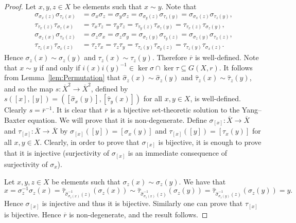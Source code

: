 	\begin{proof}
		Let $x,y,z\in X$ be elements such that $x\sim y$. Note that
		\begin{align*}
			\sigma_{\sigma_x(z)}\sigma_{\tau_z(x)} &
			=\sigma_x\sigma_z=\sigma_y\sigma_z=\sigma_{\sigma_y(z)}\sigma_{\tau_z(y)}
			=\sigma_{\sigma_x(z)}\sigma_{\tau_z(y)},\\
			\tau_{\tau_x(z)}\tau_{\sigma_z(x)} &=\tau_x\tau_z=\tau_y\tau_z
			=\tau_{\tau_y(z)}\tau_{\sigma_z(y)}=\tau_{\tau_x(z)}\tau_{\sigma_z(y)},\\
			\sigma_{\sigma_z(x)}\sigma_{\tau_x(z)} &=\sigma_z\sigma_x
			=\sigma_z\sigma_y=\sigma_{\sigma_z(y)}\sigma_{\tau_y(z)}
			=\sigma_{\sigma_z(y)}\sigma_{\tau_x(z)},\\
			\tau_{\tau_z(x)}\tau_{\sigma_x(z)} &=\tau_z\tau_x=\tau_z\tau_y
			=\tau_{\tau_z(y)}\tau_{\sigma_y(z)}=\tau_{\tau_z(y)}\tau_{\sigma_x(z)}.
		\end{align*}
		Hence $\sigma_z(x)\sim\sigma_z(y)$ and $\tau_z(x)\sim\tau_z(y)$. Therefore $\overline{r}$ is well-defined.
		Note that $x\sim y$ if and only if $i(x)i(y)^{-1}\in\ker\sigma\cap\ker\tau\subseteq G(X,r)$. It follows from Lemma~\ref{lem:Permutation}
		that $\widehat{\sigma}_z(x)\sim\widehat{\sigma}_z(y)$ and $\widehat{\tau}_z(x)\sim\widehat{\tau}_z(y)$, and so the map
		$s:\overline{X}^2\to\overline{X}^2$, defined by $s([x],[y])=([\widehat{\sigma}_x(y)],[\widehat{\tau}_y(x)])$ for all $x,y\in X$,	is well-defined. Clearly $s=\overline{r}^{-1}$. It is clear that $\overline{r}$ is a bijective set-theoretic
	 	solution to the Yang--Baxter equation. We will prove that it is non-degenerate. Define
		$\sigma_{[x]}\colon\overline{X}\to\overline{X}$ and $\tau_{[x]}\colon \overline{X}\to\overline{X}$
		by $\sigma_{[x]}([y])=[\sigma_x(y)]$ and $\tau_{[x]}([y])=[\tau_x(y)]$ for all $x,y\in X$.
		Clearly, in order to prove that $\sigma_{[x]}$ is bijective, it is enough to prove that it is injective (surjectivity
		of $\sigma_{[x]}$ is an immediate consequence of surjectivity of $\sigma_x$).
	 	
		
		Let $x,y,z\in X$ be elements such that $\sigma_z(x) \sim \sigma_z(y)$. We have that
		\[x=\sigma_z^{-1}\sigma_z(x)=\widehat{\tau}_{\widehat{\sigma}^{-1}_{\sigma_z(x)}(z)}(\sigma_z(x))
		\sim\widehat{\tau}_{\widehat{\sigma}^{-1}_{\sigma_z(x)}(z)}(\sigma_z(y))
		=\widehat{\tau}_{\widehat{\sigma}^{-1}_{\sigma_z(y)}(z)}(\sigma_z(y))=y.\]
		Hence $\sigma_{[x]}$ is injective and thus it is bijective. Similarly one can prove that
		$\tau_{[x]}$ is bijective. Hence $\overline{r}$ is non-degenerate, and the result follows.
	\end{proof}


